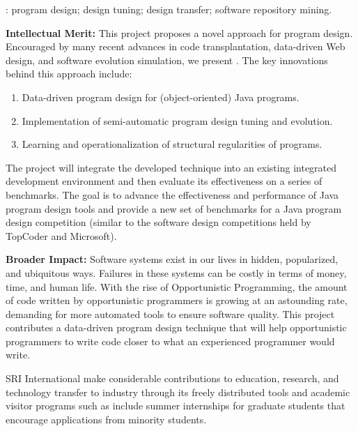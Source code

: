 \medskip{}: program design; design tuning;
design transfer; software repository mining.

\medskip\noindent
{\bf{Intellectual Merit:}}
%
This project proposes a novel approach for program design. Encouraged
by many recent advances in code transplantation, data-driven Web design,
and software evolution simulation, we present \pdm. The key innovations
behind this approach include:

\begin{enumerate}
	\item Data-driven program design for (object-oriented) Java programs.
	\item Implementation of semi-automatic program design tuning and evolution.
	\item Learning and operationalization of structural regularities of programs.
\end{enumerate}

\noindent
The project will integrate the developed \pdm technique into an existing
integrated development environment and then evaluate its effectiveness
on a series of benchmarks. The goal is to advance the effectiveness and
performance of Java program design tools and provide a new set of benchmarks
for a Java program design competition (similar to the software design
competitions held by TopCoder and Microsoft).


\medskip\noindent
{\bf{Broader Impact:}}
Software systems exist in our lives in hidden, popularized, and ubiquitous
ways. Failures in these systems can be costly in terms of money, time, and
human life. With the rise of Opportunistic Programming, the amount of code written
by opportunistic programmers is growing at an astounding rate, demanding for
more automated tools to ensure software quality. This project contributes a
data-driven program design technique that will help opportunistic programmers
to write code closer to what an experienced programmer would write.

SRI International make considerable contributions to education, research,
and technology transfer to industry through its freely distributed tools
and academic visitor programs such as include summer internships for graduate
students that encourage applications from minority students.
